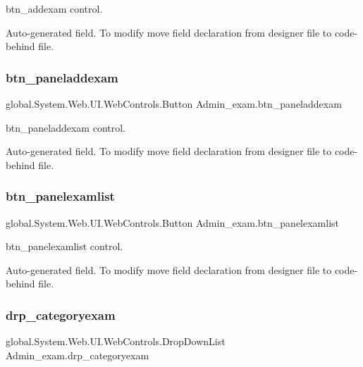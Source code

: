 btn\+\_\+addexam control. 

Auto-\/generated field. To modify move field declaration from designer file to code-\/behind file. \mbox{\label{class_admin__exam_a5d211fe1012dbc560c16df154d50c640}} 
\subsubsection{\texorpdfstring{btn\_paneladdexam}{btn\_paneladdexam}}
{\footnotesize\ttfamily global.\+System.\+Web.\+U\+I.\+Web\+Controls.\+Button Admin\+\_\+exam.\+btn\+\_\+paneladdexam\hspace{0.3cm}{\ttfamily [protected]}}



btn\+\_\+paneladdexam control. 

Auto-\/generated field. To modify move field declaration from designer file to code-\/behind file. \mbox{\label{class_admin__exam_ac66e3bc3f4108eb9214750aac4211e01}} 
\subsubsection{\texorpdfstring{btn\_panelexamlist}{btn\_panelexamlist}}
{\footnotesize\ttfamily global.\+System.\+Web.\+U\+I.\+Web\+Controls.\+Button Admin\+\_\+exam.\+btn\+\_\+panelexamlist\hspace{0.3cm}{\ttfamily [protected]}}



btn\+\_\+panelexamlist control. 

Auto-\/generated field. To modify move field declaration from designer file to code-\/behind file. \mbox{\label{class_admin__exam_ac20ec0f627753b6300bc1c7057dd36d8}} 
\subsubsection{\texorpdfstring{drp\_categoryexam}{drp\_categoryexam}}
{\footnotesize\ttfamily global.\+System.\+Web.\+U\+I.\+Web\+Controls.\+Drop\+Down\+List Admin\+\_\+exam.\+drp\+\_\+categoryexam\hspace{0.3cm}{\ttfamily [protected]}}



